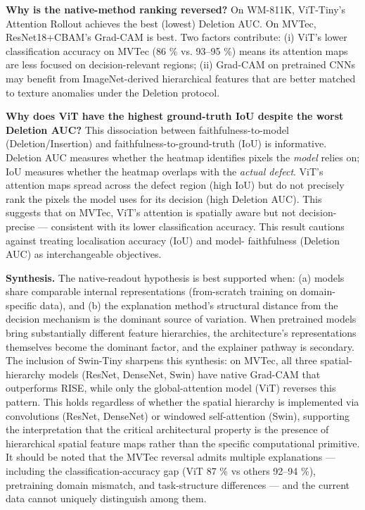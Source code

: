 \documentclass[11pt,a4paper]{article}
\begin{document}
\textbf{Why is the native-method ranking reversed?} On WM-811K, ViT-Tiny's Attention Rollout achieves the best (lowest) Deletion AUC. On MVTec, ResNet18+CBAM's Grad-CAM is best. Two factors contribute: (i) ViT's lower classification accuracy on MVTec (86 \% vs. 93--95 \%) means its attention maps are less focused on decision-relevant regions; (ii) Grad-CAM on pretrained CNNs may benefit from ImageNet-derived hierarchical features that are better matched to texture anomalies under the Deletion protocol.

\textbf{Why does ViT have the highest ground-truth IoU despite the worst Deletion AUC?} This dissociation between faithfulness-to-model (Deletion/Insertion) and faithfulness-to-ground-truth (IoU) is informative. Deletion AUC measures whether the heatmap identifies pixels the \emph{model} relies on; IoU measures whether the heatmap overlaps with the \emph{actual defect}. ViT's attention maps spread across the defect region (high IoU) but do not precisely rank the pixels the model uses for its decision (high Deletion AUC). This suggests that on MVTec, ViT's attention is spatially aware but not decision-precise --- consistent with its lower classification accuracy. This result cautions against treating localisation accuracy (IoU) and model- faithfulness (Deletion AUC) as interchangeable objectives.

\textbf{Synthesis.} The native-readout hypothesis is best supported when: (a) models share comparable internal representations (from-scratch training on domain-specific data), and (b) the explanation method's structural distance from the decision mechanism is the dominant source of variation. When pretrained models bring substantially different feature hierarchies, the architecture's representations themselves become the dominant factor, and the explainer pathway is secondary. The inclusion of Swin-Tiny sharpens this synthesis: on MVTec, all three spatial-hierarchy models (ResNet, DenseNet, Swin) have native Grad-CAM that outperforms RISE, while only the global-attention model (ViT) reverses this pattern. This holds regardless of whether the spatial hierarchy is implemented via convolutions (ResNet, DenseNet) or windowed self-attention (Swin), supporting the interpretation that the critical architectural property is the presence of hierarchical spatial feature maps rather than the specific computational primitive. It should be noted that the MVTec reversal admits multiple explanations --- including the classification-accuracy gap (ViT 87 \% vs others 92--94 \%), pretraining domain mismatch, and task-structure differences --- and the current data cannot uniquely distinguish among them.
\end{document}
